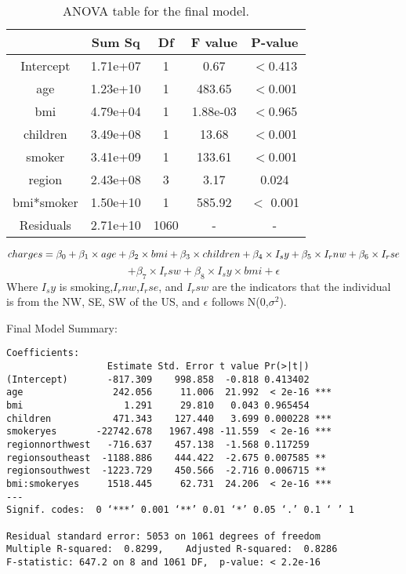 \documentclass[12pt]{article}
\begin{document}
\begin{table}[ht]
\centering
\caption{ ANOVA table for the final model.\label{data3}}
\begin{tabular}{|c|c|c|c|c|}
\hline
&Sum Sq &Df &F value &P-value\\\hline
Intercept& 1.71e+07& 1& 0.67& $<$0.413\\\hline
age& 1.23e+10& 1& 483.65& $<$0.001\\\hline
bmi& 4.79e+04& 1& 1.88e-03& $<$0.965\\\hline
children& 3.49e+08& 1& 13.68& $<$0.001\\ \hline 
smoker& 3.41e+09& 1& 133.61& $<$0.001\\\hline
region& 2.43e+08& 3& 3.17& 0.024\\\hline
bmi*smoker& 1.50e+10& 1& 585.92& $<$ 0.001\\\hline
Residuals& 2.71e+10& 1060& -& -\\\hline         
\end{tabular}
\end{table}
\newpage


\begin{equation}
charges = \beta_0+\beta_1\times age +\beta_2\times bmi +\beta_3\times children +\beta_4\times I_sy + \beta_5\times I_rnw+ \beta_6\times I_rse \\
\end{equation}
$$+ \beta_7\times I_rsw+ \beta_8\times I_sy \times bmi+\epsilon$$
Where $I_sy$ is smoking,$I_rnw$,$I_rse$, and $I_rsw$ are the indicators that the individual is from the NW, SE, SW of the US, and $\epsilon$ follows N(0,$\sigma^2$).
\medskip

Final Model Summary:
\begin{verbatim}
Coefficients:
                  Estimate Std. Error t value Pr(>|t|)    
(Intercept)       -817.309    998.858  -0.818 0.413402    
age                242.056     11.006  21.992  < 2e-16 ***
bmi                  1.291     29.810   0.043 0.965454    
children           471.343    127.440   3.699 0.000228 ***
smokeryes       -22742.678   1967.498 -11.559  < 2e-16 ***
regionnorthwest   -716.637    457.138  -1.568 0.117259    
regionsoutheast  -1188.886    444.422  -2.675 0.007585 ** 
regionsouthwest  -1223.729    450.566  -2.716 0.006715 ** 
bmi:smokeryes     1518.445     62.731  24.206  < 2e-16 ***
---
Signif. codes:  0 ‘***’ 0.001 ‘**’ 0.01 ‘*’ 0.05 ‘.’ 0.1 ‘ ’ 1

Residual standard error: 5053 on 1061 degrees of freedom
Multiple R-squared:  0.8299,	Adjusted R-squared:  0.8286 
F-statistic: 647.2 on 8 and 1061 DF,  p-value: < 2.2e-16
\end{verbatim}
 
\end{document}
